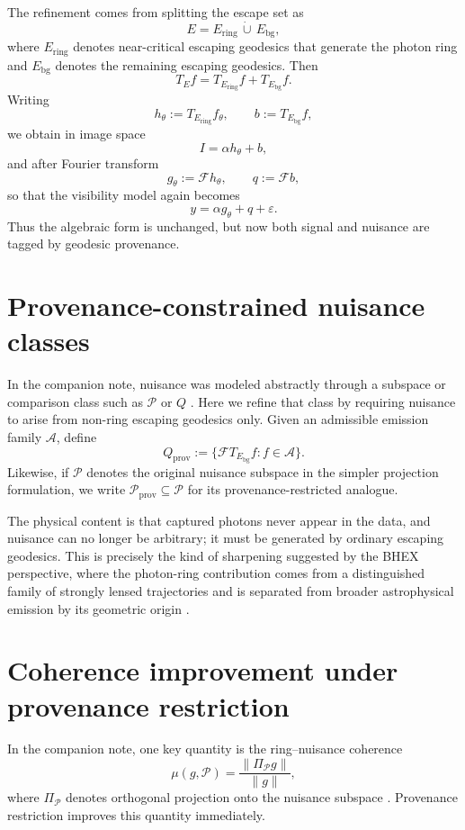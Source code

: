 \documentclass[10pt,letterpaper,twocolumn]{article}
\begin{document}
The refinement comes from splitting the escape set as
\[
E = E_{\mathrm{ring}} \,\dot\cup\, E_{\mathrm{bg}},
\]
where $E_{\mathrm{ring}}$ denotes near-critical escaping geodesics that generate the photon ring and $E_{\mathrm{bg}}$ denotes the remaining escaping geodesics. Then
\[
T_E f = T_{E_{\mathrm{ring}}}f + T_{E_{\mathrm{bg}}}f.
\]
Writing
\[
h_\theta := T_{E_{\mathrm{ring}}}f_\theta,
\qquad
b := T_{E_{\mathrm{bg}}}f,
\]
we obtain in image space
\[
I = \alpha h_\theta + b,
\]
and after Fourier transform
\[
g_\theta := \mathcal F h_\theta,
\qquad
q := \mathcal F b,
\]
so that the visibility model again becomes
\[
y = \alpha g_\theta + q + \varepsilon.
\]
Thus the algebraic form is unchanged, but now both signal and nuisance are tagged by geodesic provenance.

\section{Provenance-constrained nuisance classes}

In the companion note, nuisance was modeled abstractly through a subspace or comparison class such as $\mathcal P$ or $Q$ \cite{LandersFourierBHEX}. Here we refine that class by requiring nuisance to arise from non-ring escaping geodesics only. Given an admissible emission family $\mathcal A$, define
\[
Q_{\mathrm{prov}}
:=
\bigl\{\mathcal F T_{E_{\mathrm{bg}}}f : f\in\mathcal A\bigr\}.
\]
Likewise, if $\mathcal P$ denotes the original nuisance subspace in the simpler projection formulation, we write $\mathcal P_{\mathrm{prov}}\subseteq\mathcal P$ for its provenance-restricted analogue.

The physical content is that captured photons never appear in the data, and nuisance can no longer be arbitrary; it must be generated by ordinary escaping geodesics. This is precisely the kind of sharpening suggested by the BHEX perspective, where the photon-ring contribution comes from a distinguished family of strongly lensed trajectories and is separated from broader astrophysical emission by its geometric origin \cite{BHEXDetection,BHEXSpin}.

\section{Coherence improvement under provenance restriction}

In the companion note, one key quantity is the ring--nuisance coherence
\[
\mu(g,\mathcal P)=\frac{\|\Pi_{\mathcal P}g\|}{\|g\|},
\]
where $\Pi_{\mathcal P}$ denotes orthogonal projection onto the nuisance subspace \cite{LandersFourierBHEX}. Provenance restriction improves this quantity immediately.
\end{document}
